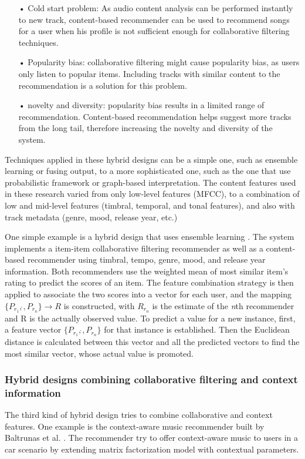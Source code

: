 \begin{itemize}
\item[•] Cold start problem: As audio content analysis can be performed instantly to new track, content-based recommender can be used to recommend songs for a user when his profile is not sufficient enough for collaborative filtering techniques. 

\item[•] Popularity bias: collaborative filtering might cause popularity bias, as users only listen to popular items. Including tracks with similar content to the recommendation is a solution for this problem.

\item[•] novelty and diversity: popularity bias results in a limited range of recommendation. Content-based recommendation helps suggest more tracks from the long tail, therefore increasing the novelty and diversity of the system.
\end{itemize}

Techniques applied in these hybrid designs can be a simple one, such as ensemble learning or fusing output, to a more sophisticated one, such as the one that use probabilistic framework or graph-based interpretation. The content features used in these research varied from only low-level features (MFCC), to a combination of low and mid-level features (timbral, temporal, and tonal features), and also with track metadata (genre, mood, release year, etc.)

One simple example is a hybrid design that uses ensemble learning \cite{tiemann2007towards}. The system implements a item-item collaborative filtering recommender as well as a content-based recommender using timbral, tempo, genre, mood, and release year information. Both recommenders use the weighted mean of most similar item's rating to predict the scores of an item. The feature combination strategy is then applied to associate the two scores into a vector for each user, and the mapping \(\{P_{r_1},\dot{},P_{r_n}\} \rightarrow R \) is constructed, with \( R_{r_n} \) is the estimate of the \textit{n}th recommender and R is the actually observed value. To predict a value for a new instance, first, a feature vector \( \{P_{r_1},\dot{},P_{r_n}\} \) for that instance is established. Then the Euclidean distance is calculated between this vector and all the predicted vectors to find the most similar vector, whose actual value is promoted. 

\subsubsection{Hybrid designs combining collaborative filtering and context information}
The third kind of hybrid design tries to combine collaborative and context features. One example is the context-aware music recommender built by Baltrunas et al. \cite{baltrunas2011incarmusic}. The recommender try to offer context-aware music to users in a car scenario by extending matrix factorization model with contextual parameters.

